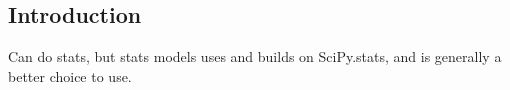 
\subsection{Introduction}

Can do stats, but stats models uses and builds on SciPy.stats, and is generally a better choice to use.
